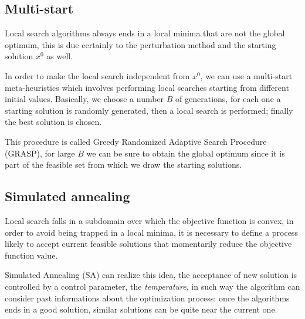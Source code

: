 \subsection{Multi-start}\label{subsc:multi-start}

Local search algorithms always ends in a local minima that are not the global optimum, this is due certainly to the perturbation method and the starting solution $x^0$ as well.

In order to make the local search independent from $x^0$, we can use a multi-start meta-heuristics which involves performing local searches starting from different initial values. Basically, we choose a number $B$ of generations, for each one a starting solution is randomly generated, then a local search is performed; finally the best solution is chosen.

This procedure is called Greedy Randomized Adaptive Search Procedure (GRASP), for large $B$ we can be sure to obtain the global optimum since it is part of the feasible set from which we draw the starting solutions.



\subsection{Simulated annealing}

Local search falls in a subdomain over which the objective function is convex, in order to avoid being trapped in a local minima, it is necessary to define a process likely to accept current feasible solutions that momentarily reduce the objective function value.

Simulated Annealing (SA) can realize this idea, the acceptance of new solution is controlled by a control parameter, the \emph{temperature}, in such way the algorithm can consider past informations about the optimization process: once the algorithms ends in a good solution, similar solutions can be quite near the current one.

